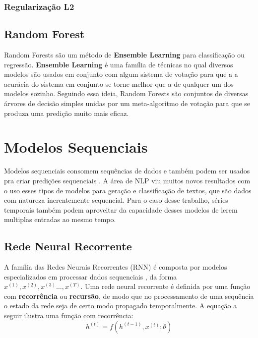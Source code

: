 \bigskip

\subsubsection{Regularização L2}
 
\subsection{Random Forest}

Random Forests são um método de \textbf{Ensemble Learning} para classificação ou regressão. \textbf{Ensemble Learning} é uma família de técnicas no qual diversos modelos  são usados em conjunto com algum sistema de votação para que a a acurácia do sistema em conjunto se torne melhor que a de qualquer um dos modelos sozinho. Seguindo essa ideia, Random Forests são conjuntos de diversas árvores de decisão simples unidas por um meta-algoritmo de votação para que se produza uma predição muito mais eficaz.


\section{Modelos Sequenciais}

Modelos sequenciais consomem sequências de dados e também podem ser usados pra
criar predições sequenciais \citep{dlbook}. A área de NLP viu muitos novos
resultados com o uso esses tipos de modelos para geração e classificação de textos, que são dados com
natureza inerentemente sequencial. Para o caso desse trabalho, séries temporais também podem
aproveitar da capacidade desses modelos de lerem multiplas entradas ao mesmo tempo.

\subsection{Rede Neural Recorrente}
% 

A família das Redes Neurais Recorrentes (RNN) é composta por modelos especializados
em processar dados sequenciais \citep{dlbook}, da forma $x^{(1)},x^{(2)} ,x^{(3)}\dots ,x^{(T)}$. Uma rede neural recorrente é definida por uma função com
\textbf{recorrência} ou \textbf{recursão}, de modo que no processamento de uma
sequência o estado da rede seja de certo modo propagado temporalmente. A equação
a seguir ilustra uma função com recorrência: \\

\[h^{(t)} = f(h^{(t-1)},x^{(t)};\theta)\]

